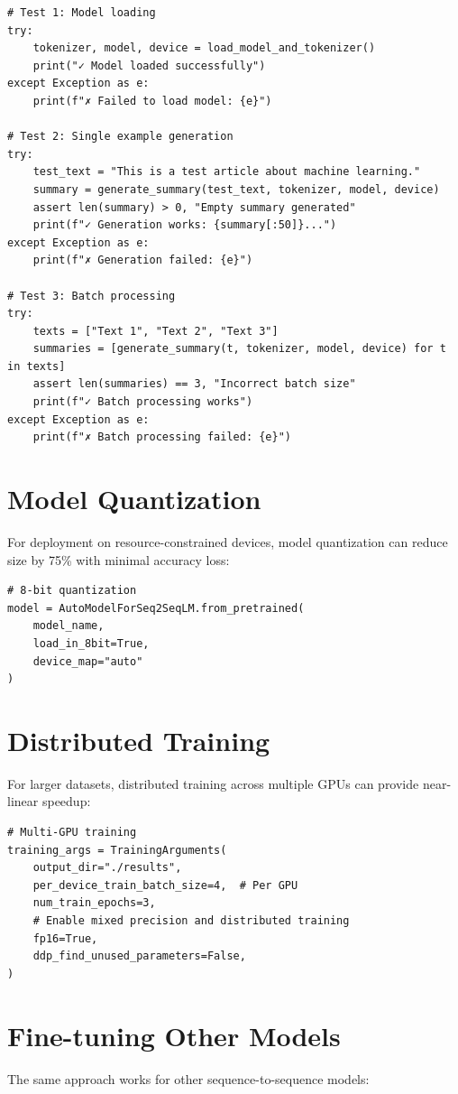 \documentclass[12pt,a4paper,oneside]{report}
\begin{document}
\begin{lstlisting}
# Test 1: Model loading
try:
    tokenizer, model, device = load_model_and_tokenizer()
    print("✓ Model loaded successfully")
except Exception as e:
    print(f"✗ Failed to load model: {e}")

# Test 2: Single example generation
try:
    test_text = "This is a test article about machine learning."
    summary = generate_summary(test_text, tokenizer, model, device)
    assert len(summary) > 0, "Empty summary generated"
    print(f"✓ Generation works: {summary[:50]}...")
except Exception as e:
    print(f"✗ Generation failed: {e}")

# Test 3: Batch processing
try:
    texts = ["Text 1", "Text 2", "Text 3"]
    summaries = [generate_summary(t, tokenizer, model, device) for t in texts]
    assert len(summaries) == 3, "Incorrect batch size"
    print(f"✓ Batch processing works")
except Exception as e:
    print(f"✗ Batch processing failed: {e}")
\end{lstlisting}

\newpage



\section{Model Quantization}
For deployment on resource-constrained devices, model quantization can reduce size by 75\% with minimal accuracy loss:

\begin{lstlisting}
# 8-bit quantization
model = AutoModelForSeq2SeqLM.from_pretrained(
    model_name, 
    load_in_8bit=True,
    device_map="auto"
)
\end{lstlisting}

\section{Distributed Training}
For larger datasets, distributed training across multiple GPUs can provide near-linear speedup:

\begin{lstlisting}
# Multi-GPU training
training_args = TrainingArguments(
    output_dir="./results",
    per_device_train_batch_size=4,  # Per GPU
    num_train_epochs=3,
    # Enable mixed precision and distributed training
    fp16=True,
    ddp_find_unused_parameters=False,
)
\end{lstlisting}

\section{Fine-tuning Other Models}
The same approach works for other sequence-to-sequence models:
\end{document}
